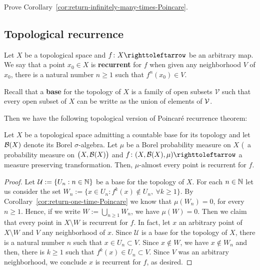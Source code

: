 \begin{exercise}
  Prove Corollary~\ref{cor:return-infinitely-many-times-Poincare}.
\end{exercise}

\subsection{Topological recurrence}\label{sec:topological-recurrence-Poincare}

Let $X$ be a topological space and $f\colon X\carr$ be an arbitrary map. We say that a point $x_{0}\in X$ is \textbf{recurrent} for $f$ when given any neighborhood $V$ of $x_{0}$, there is a natural number $n\geq 1$ such that $f^{n}(x_{0})\in V$.

Recall that a \textbf{base} for the topology of $X$ is a family of open subsets $\mathcal{V}$ such that every open subset of $X$ can be writte as the union of elements of $\mathcal{V}$.

Then we have the following topological version of Poincaré recurrence theorem:

\begin{theorem}\label{thm:Poincare-recurrence-thm-topological-version}
  Let $X$ be a topological space admitting a countable base for its topology and let $\mathcal{B}(X)$ denote its Borel $\sigma$-algebra. Let $\mu$ be a Borel probability measure on $X$ (\ie~a probability measure on $\big(X,\mathcal{B}(X)\big)$ and $f\colon (X,\mc{B}(X),\mu)\carr$ a measure preserving transformation. Then, $\mu$-almost every point is recurrent for $f$.
\end{theorem}


\begin{proof}
  Let $\mathcal{U}:=\{U_{n} : n\in\mathbb{N}\}$ be a base for the topology of $X$. For each $n\in\mathbb{N}$ let us consider the set $W_{n}:=\{x\in U_{n}  : f^{k}(x)\not\in U_{n},\ \forall k\geq 1\}$. By Corollary~\ref{cor:return-one-time-Poincare} we know that $\mu(W_{n})=0$, for every $n\geq 1$. Hence, if we write $W:=\bigcup_{n\geq 1} W_{n}$, we have $\mu(W)=0$. Then we claim that every point in $X\setminus W$ is recurrent for $f$. In fact, let $x$ an arbitrary point of $X\setminus W$ and $V$ any neighborhood of $x$. Since $\mathcal{U}$ is a base for the topology of $X$, there is a natural number $n$ such that $x\in U_{n}\subset V$. Since $x\not\in W$, we have $x\not\in W_{n}$ and then, there is $k\geq 1$ such that $f^{k}(x)\in U_{n}\subset V$. Since $V$ was an arbitrary neighborhood, we conclude $x$ is recurrent for $f$, as desired.
\end{proof}

